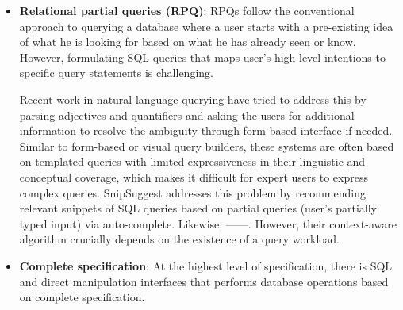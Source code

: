 \documentclass{sig-alternate-05-2015}
\begin{document}
\begin{itemize}
\item \textbf{Relational partial queries (RPQ)}: RPQs follow the conventional approach to querying a database where a user starts with a pre-existing idea of what he is looking for based on what he has already seen or know. However, formulating SQL queries that maps user's high-level intentions to specific query statements is challenging. 
\par Recent work in natural language querying have tried to address this by parsing adjectives and quantifiers and asking the users for additional information to resolve the ambiguity through form-based interface if needed. Similar to form-based or visual query builders\cite{Abouzied2012}, these systems are often based on templated queries with limited expressiveness in their linguistic and conceptual coverage, which makes it difficult for expert users to express complex queries. SnipSuggest addresses this problem by recommending relevant snippets of SQL queries based on partial queries (user's partially typed input) via auto-complete\cite{Khoussainova2010}. Likewise, ------. However, their context-aware algorithm crucially depends on the existence of a query workload. 
\item \textbf{Complete specification}: At the highest level of specification, there is SQL and direct manipulation interfaces that performs database operations based on complete specification.
\end{itemize}
\end{document}
